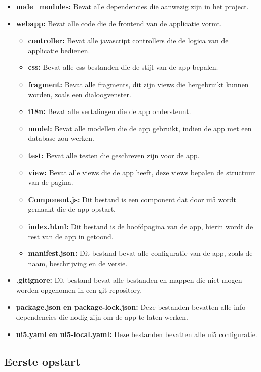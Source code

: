 \begin{itemize}
    \item \textbf{node\_modules:} Bevat alle dependencies die aanwezig zijn in het project.
    \item \textbf{webapp:} Bevat alle code die de frontend van de applicatie vormt.
    \begin{itemize}
        \item \textbf{controller:} Bevat alle javascript controllers die de logica van de applicatie bedienen.
        \item \textbf{css:} Bevat alle css bestanden die de stijl van de app bepalen.
        \item \textbf{fragment: } Bevat alle fragments, dit zijn views die hergebruikt kunnen worden, zoals een dialoogvenster.
        \item \textbf{i18n:} Bevat alle vertalingen die de app ondersteunt.
        \item \textbf{model:} Bevat alle modellen die de app gebruikt, indien de app met een database zou werken.
        \item \textbf{test: } Bevat alle testen die geschreven zijn voor de app.
        \item \textbf{view:} Bevat alle views die de app heeft, deze views bepalen de structuur van de pagina.
        \item \textbf{Component.js:} Dit bestand is een component dat door ui5 wordt gemaakt die de app opstart.
        \item \textbf{index.html:} Dit bestand is de hoofdpagina van de app, hierin wordt de rest van de app in getoond.
        \item \textbf{manifest.json:} Dit bestand bevat alle configuratie van de app, zoals de naam, beschrijving en de versie.
    \end{itemize}
    \item \textbf{.gitignore:} Dit bestand bevat alle bestanden en mappen die niet mogen worden opgenomen in een git repository.
    \item \textbf{package.json en package-lock.json:} Deze bestanden bevatten alle info dependencies die nodig zijn om de app te laten werken.
    \item \textbf{ui5.yaml en ui5-local.yaml:} Deze bestanden bevatten alle ui5 configuratie.
\end{itemize}

\subsection{Eerste opstart}

